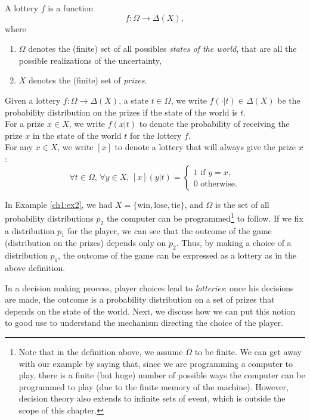 \begin{definition}[Lottery]
\label{ch1:def1:lottery}
A lottery $f$ is a function
$$ f : \Omega \rightarrow \Delta(X), $$
where
\begin{enumerate}
\item $\Omega$  denotes the (finite) set of all possibles \emph{states of the world}, that are all the possible realizations of the uncertainty,
\item $X$ denotes the (finite) set of \emph{prizes}.
\end{enumerate}
\end{definition}
\begin{notation}[$f(\cdot | t), \, f(x | t)$]
Given a lottery $f : \Omega \rightarrow \Delta(X)$, a state $t \in \Omega$, we write $f(\cdot | t) \in \Delta(X)$ be the probability distribution on the prizes if the state of the world is $t$.\\ For a prize $x \in X$, we write $f(x|t)$ to denote the probability of receiving the prize $x$ in the state of the world $t$ for the lottery $f$.\\
For any $x \in X$, we write $[x]$ to denote a lottery that will always give the prize $x$:
$$ \forall t \in \Omega, \, \forall y \in X, \, [x](y|t) =
\begin{cases}
1 \text{ if } y = x,\\
0 \text{ otherwise.}
\end{cases} $$
\end{notation}
In Example \ref{ch1:ex2}, we had $X = \{\text{win}, \text{lose}, \text{tie} \}$,
and $\Omega$ is the set of all probability distributions $p_2$ the computer can be programmed\footnote{Note that in the definition above, we assume $\Omega$ to be finite. We can get away with our example by saying that, since we are programming a computer to play, there is  a finite (but huge) number of possible ways the computer can be programmed to play (due to the finite memory of the machine). However, decision theory also extends to infinite sets of event, which is outside the scope of this chapter.} to follow.  If we fix a distribution $p_1$ for the player, we can see that the outcome of the game (distribution on the prizes) depends only on $p_2$. Thus, by making a choice of a distribution $p_1$, the outcome of the game can be expressed as a lottery as in the above definition.


In a decision making process, player choices lead to  \emph{lotteries}: once his decisions are made, the outcome is a probability distribution on a set of prizes that depends on the state of the world.  Next, we discuss how we can put this notion to good use to understand the mechanism directing the choice of the player.

